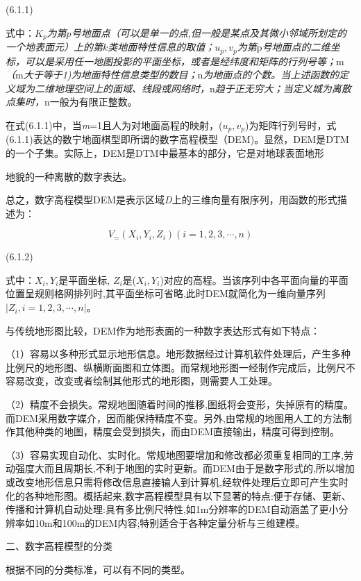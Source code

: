 (6.1.1)

式中：\emph{\(K_p\)为第}\(p\)\emph{号地面点（可以是单一的点,但一般是某点及其微小邻域所划定的一个地表面元）上的第}\(k\)\emph{类地面特性信息的取值；\(u_p,v_p\)为第}p\emph{号地面点的二维坐标，可以是采用任一地图投影的平面坐标，或者是经纬度和矩阵的行列号等；}m\emph{（}m\emph{大于等于1)为地面特性信息类型的数目；}n\emph{为地面点的个数。当上述函数的定义域为二维地理空间上的面域、线段或网络时，}n\emph{趋于正无穷大；当定义城为离散点集时，}n一般为有限正整数。

在式(6.1.1)中，当\emph{m}=1且人为对地面高程的映射，(\(u_p,v_p\))为矩阵行列号时，式(6.1.1)表达的数宁地面棋型即所谓的数字高程模型（DEM)。显然，DEM是DTM的一个子集。实际上，DEM是DTM中最基本的部分，它是对地球表面地形

地貌的一种离散的数字表达。

总之，数字高程模型DEM是表示区域\emph{D}上的三维向量有限序列，用函数的形式描述为：

\begin{equation}
V_=(X_i,Y_i,Z_i)(i=1,2,3,\cdots,n)
\end{equation}

(6.1.2)

式中：\(X_i,Y_i\)是平面坐标, \(Z_i\)是(\(X_i,Y_i\))对应的高程。当该序列中各平面向量的平面位置呈规则格网排列时,其平面坐标可省略,此时DEM就简化为一维向量序列\(|Z_i,i=1,2,3,\cdots,n|\)。

与传统地形图比较，DEM作为地形表面的一种数字表达形式有如下特点：

（1）容易以多种形式显示地形信息。地形数据经过计算机软件处理后，产生多种比例尺的地形图、纵横断面图和立体图。而常规地形图一经制作完成后，比例尺不容易改变，改变或者绘制其他形式的地形图，则需要人工处理。

（2）精度不会损失。常规地图随着时间的推移,图纸将会变形，失掉原有的精度。而DEM采用数字媒介，因而能保持精度不变。另外,由常规的地图用人工的方法制作其他种类的地图，精度会受到损失，而由DEM直接输出，精度可得到控制。

（3）容易实现自动化、实时化。常规地图要增加和修改都必须重复相同的工序,劳动强度大而且周期长,不利于地图的实时更新。而DEM由于是数字形式的,所以增加或改变地形信息只需将修改信息直接输人到计算机,经软件处理后立即可产生实时化的各种地形图。概括起来,数字高程模型具有以下显著的特点:便于存储、更新、传播和计算机自动处理:具有多比例尺特性,如1m分辨率的DEM自动涵盖了更小分辨率如10m和100m的DEM内容;特别适合于各种定量分析与三维建模。

二、数字高程模型的分类

根据不同的分类标准，可以有不同的类型。

